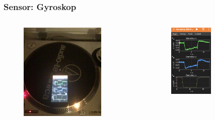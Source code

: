\documentclass{beamer}
\begin{document}
\begin{frame}
    \frametitle{Sensor: Gyroskop} 
    \begin{columns}
        \begin{figure}[htpb]
            \centering
            \includegraphics[width=0.8\textwidth]{gyro_turntable}
        \end{figure}
        \begin{figure}[htpb]
            \centering
            \includegraphics[width=0.6\textwidth]{gyro_turntable2}

\end{figure}
\end{columns}
\end{frame}
\end{document}
